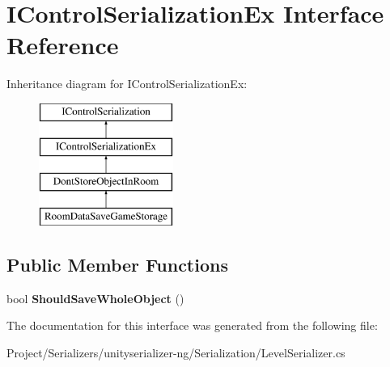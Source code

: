 \hypertarget{interface_i_control_serialization_ex}{}\section{I\+Control\+Serialization\+Ex Interface Reference}
\label{interface_i_control_serialization_ex}
Inheritance diagram for I\+Control\+Serialization\+Ex\+:\begin{figure}[H]
\begin{center}
\leavevmode
\includegraphics[height=4.000000cm]{interface_i_control_serialization_ex}
\end{center}
\end{figure}
\subsection*{Public Member Functions}
\begin{DoxyCompactItemize}
\item 
\mbox{\label{interface_i_control_serialization_ex_a7632c9b446f991de87cfd0f4a69bfeb7}} 
bool {\bfseries Should\+Save\+Whole\+Object} ()
\end{DoxyCompactItemize}


The documentation for this interface was generated from the following file\+:\begin{DoxyCompactItemize}
\item 
Project/\+Serializers/unityserializer-\/ng/\+Serialization/Level\+Serializer.\+cs\end{DoxyCompactItemize}
